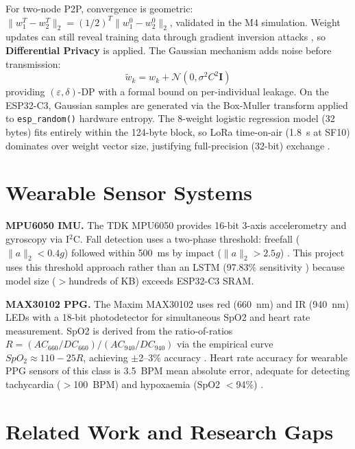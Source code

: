 For two-node P2P, convergence is geometric: $\|w_1^T - w_2^T\|_2 = (1/2)^T \|w_1^0 - w_2^0\|_2$, validated in the M4 simulation. Weight updates can still reveal training data through gradient inversion attacks \cite{Zhu2019}, so \textbf{Differential Privacy} \cite{Dwork2006, Abadi2016} is applied. The Gaussian mechanism adds noise before transmission:
\begin{equation}
\tilde{w}_k = w_k + \mathcal{N}(0, \sigma^2 C^2 \mathbf{I})
\end{equation}
providing $(\varepsilon,\delta)$-DP with a formal bound on per-individual leakage. On the ESP32-C3, Gaussian samples are generated via the Box-Muller transform applied to \texttt{esp\_random()} hardware entropy. The 8-weight logistic regression model (32 bytes) fits entirely within the 124-byte block, so LoRa time-on-air (1.8~s at SF10) dominates over weight vector size, justifying full-precision (32-bit) exchange \cite{Konecny2016}.

\section{Wearable Sensor Systems}

\textbf{MPU6050 IMU.} The TDK MPU6050 provides 16-bit 3-axis accelerometry and gyroscopy via I$^2$C. Fall detection uses a two-phase threshold: freefall ($\|a\|_2 < 0.4g$) followed within 500~ms by impact ($\|a\|_2 > 2.5g$) \cite{Bourke2006}. This project uses this threshold approach rather than an LSTM (97.83\% sensitivity \cite{Nho2020}) because model size ($>$hundreds of KB) exceeds ESP32-C3 SRAM.

\textbf{MAX30102 PPG.} The Maxim MAX30102 uses red (660~nm) and IR (940~nm) LEDs with a 18-bit photodetector for simultaneous SpO2 and heart rate measurement. SpO2 is derived from the ratio-of-ratios $R = (AC_{660}/DC_{660})/(AC_{940}/DC_{940})$ via the empirical curve $SpO_2 \approx 110 - 25R$, achieving $\pm$2--3\% accuracy \cite{Maxim2018}. Heart rate accuracy for wearable PPG sensors of this class is 3.5~BPM mean absolute error, adequate for detecting tachycardia ($>$100~BPM) and hypoxaemia (SpO2 $<$94\%) \cite{Bruns2021}.

\section{Related Work and Research Gaps}

